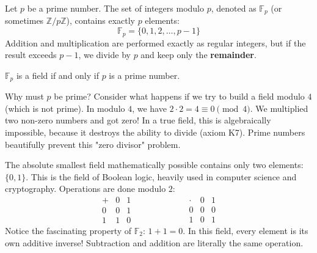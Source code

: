 \begin{center}
\end{center}

\begin{definition}
Let $p$ be a prime number. The set of integers modulo $p$, denoted as $\mathbb{F}_p$ (or sometimes $\mathbb{Z}/p\mathbb{Z}$), contains exactly $p$ elements:
\[
\mathbb{F}_p = \{0, 1, 2, \dots, p-1\}
\]
Addition and multiplication are performed exactly as regular integers, but if the result exceeds $p-1$, we divide by $p$ and keep only the \textbf{remainder}.
\end{definition}

\begin{theorem}
$\mathbb{F}_p$ is a field if and only if $p$ is a prime number.
\end{theorem}

Why must $p$ be prime? Consider what happens if we try to build a field modulo $4$ (which is not prime). In modulo $4$, we have $2 \cdot 2 = 4 \equiv 0 \pmod 4$. We multiplied two non-zero numbers and got zero! In a true field, this is algebraically impossible, because it destroys the ability to divide (axiom K7). Prime numbers beautifully prevent this "zero divisor" problem.

\begin{example}
The absolute smallest field mathematically possible contains only two elements: $\{0, 1\}$. This is the field of Boolean logic, heavily used in computer science and cryptography. Operations are done modulo $2$:
\[
\begin{array}{c|cc}
+ & 0 & 1 \\
\hline
0 & 0 & 1 \\
1 & 1 & 0
\end{array}
\qquad\qquad\qquad
\begin{array}{c|cc}
\cdot & 0 & 1 \\
\hline
0 & 0 & 0 \\
1 & 0 & 1
\end{array}
\]
Notice the fascinating property of $\mathbb{F}_2$: $1 + 1 = 0$. In this field, every element is its own additive inverse! Subtraction and addition are literally the same operation.
\end{example}

